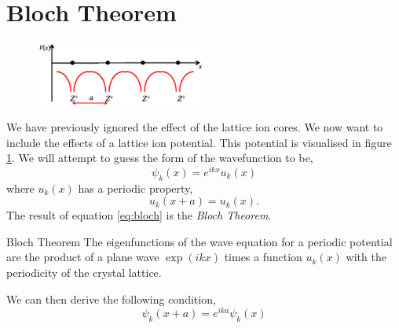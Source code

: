 \documentclass{book}
\begin{document}
\section{Bloch Theorem}
\begin{figure}[h]
	\centering
	\includegraphics[width=0.5\textwidth]{lattice.png}
	\caption{}
	\label{fig:lattice}
\end{figure}
We have previously ignored the effect of the lattice ion cores. We now want to include the effects of a lattice ion potential. This potential is visualised in figure \ref{fig:lattice}. We will attempt to guess the form of the wavefunction to be,
\begin{equation}
	\psi_k(x) = e^{ikx}u_k(x) \label{eq:bloch}
\end{equation}
where $u_k(x)$ has a periodic property,
\begin{equation}
	u_k(x+a) = u_k(x).
\end{equation}
The result of equation \eqref{eq:bloch} is the \textit{Bloch Theorem}.
\begin{Theorems}{Bloch Theorem}
	The eigenfunctions of the wave equation for a periodic potential are the product of a plane wave $\exp(ikx)$ times a function $u_k(x)$ with the periodicity of the crystal lattice. 
\end{Theorems}
We can then derive the following condition,
\begin{equation}
	\psi_k(x + a) = e^{ika}\psi_k(x)
\end{equation}
\end{document}
